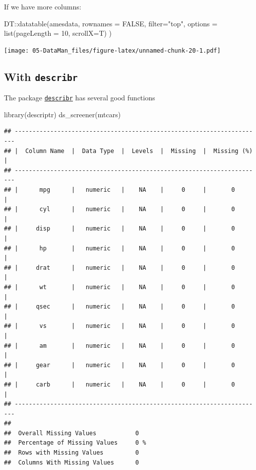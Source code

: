 \documentclass[
]{book}
\newenvironment{Shaded}{\begin{snugshade}}{\end{snugshade}}
\newcommand{\AttributeTok}[1]{\textcolor[rgb]{0.77,0.63,0.00}{#1}}
\newcommand{\ConstantTok}[1]{\textcolor[rgb]{0.00,0.00,0.00}{#1}}
\newcommand{\DecValTok}[1]{\textcolor[rgb]{0.00,0.00,0.81}{#1}}
\newcommand{\FunctionTok}[1]{\textcolor[rgb]{0.00,0.00,0.00}{#1}}
\newcommand{\NormalTok}[1]{#1}
\newcommand{\SpecialCharTok}[1]{\textcolor[rgb]{0.00,0.00,0.00}{#1}}
\newcommand{\StringTok}[1]{\textcolor[rgb]{0.31,0.60,0.02}{#1}}
\begin{document}
If we have more columns:

\begin{Shaded}
\begin{Highlighting}[]
\NormalTok{DT}\SpecialCharTok{::}\FunctionTok{datatable}\NormalTok{(amesdata, }\AttributeTok{rownames =} \ConstantTok{FALSE}\NormalTok{, }\AttributeTok{filter=}\StringTok{"top"}\NormalTok{, }\AttributeTok{options =} \FunctionTok{list}\NormalTok{(}\AttributeTok{pageLength =} \DecValTok{10}\NormalTok{, }\AttributeTok{scrollX=}\NormalTok{T) )}
\end{Highlighting}
\end{Shaded}

\texttt{[image: 05-DataMan\_files/figure-latex/unnamed-chunk-20-1.pdf]}

\hypertarget{with-describr}{%
\subsection{\texorpdfstring{With \texttt{describr}}{With describr}}\label{with-describr}}

The package \href{https://cran.r-project.org/web/packages/descriptr/descriptr.pdf}{\texttt{describr}} has several good functions

\begin{Shaded}
\begin{Highlighting}[]
\FunctionTok{library}\NormalTok{(descriptr)}
\FunctionTok{ds\_screener}\NormalTok{(mtcars)}
\end{Highlighting}
\end{Shaded}

\begin{verbatim}
## ----------------------------------------------------------------------
## |  Column Name  |  Data Type  |  Levels  |  Missing  |  Missing (%)  |
## ----------------------------------------------------------------------
## |      mpg      |   numeric   |    NA    |     0     |       0       |
## |      cyl      |   numeric   |    NA    |     0     |       0       |
## |     disp      |   numeric   |    NA    |     0     |       0       |
## |      hp       |   numeric   |    NA    |     0     |       0       |
## |     drat      |   numeric   |    NA    |     0     |       0       |
## |      wt       |   numeric   |    NA    |     0     |       0       |
## |     qsec      |   numeric   |    NA    |     0     |       0       |
## |      vs       |   numeric   |    NA    |     0     |       0       |
## |      am       |   numeric   |    NA    |     0     |       0       |
## |     gear      |   numeric   |    NA    |     0     |       0       |
## |     carb      |   numeric   |    NA    |     0     |       0       |
## ----------------------------------------------------------------------
## 
##  Overall Missing Values           0 
##  Percentage of Missing Values     0 %
##  Rows with Missing Values         0 
##  Columns With Missing Values      0
\end{verbatim}
\end{document}

